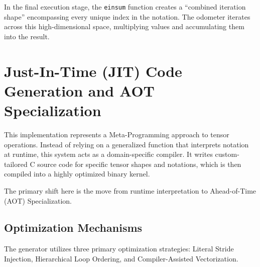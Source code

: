 \documentclass[binding=0.6cm]{sapthesis}
\begin{document}
In the final execution stage, the \texttt{einsum} function creates a ``combined iteration shape'' encompassing every unique index in the notation. The odometer iterates across this high-dimensional space, multiplying values and accumulating them into the result.

\section{Just-In-Time (JIT) Code Generation and AOT Specialization}

This implementation represents a Meta-Programming approach to tensor operations. Instead of relying on a generalized function that interprets notation at runtime, this system acts as a domain-specific compiler. It writes custom-tailored C source code for specific tensor shapes and notations, which is then compiled into a highly optimized binary kernel.

The primary shift here is the move from runtime interpretation to Ahead-of-Time (AOT) Specialization.

\subsection{Optimization Mechanisms}

The generator utilizes three primary optimization strategies: Literal Stride Injection, Hierarchical Loop Ordering, and Compiler-Assisted Vectorization.
\end{document}
